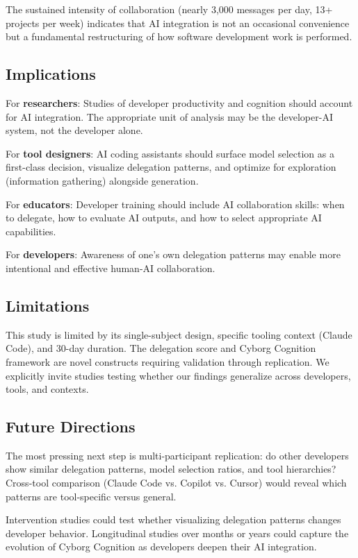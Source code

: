 \documentclass{ntlabs-preprint}
\begin{document}
The sustained intensity of collaboration (nearly 3,000 messages per day, 13+ projects per week) indicates that AI integration is not an occasional convenience but a fundamental restructuring of how software development work is performed.

\subsection{Implications}

For \textbf{researchers}: Studies of developer productivity and cognition should account for AI integration. The appropriate unit of analysis may be the developer-AI system, not the developer alone.

For \textbf{tool designers}: AI coding assistants should surface model selection as a first-class decision, visualize delegation patterns, and optimize for exploration (information gathering) alongside generation.

For \textbf{educators}: Developer training should include AI collaboration skills: when to delegate, how to evaluate AI outputs, and how to select appropriate AI capabilities.

For \textbf{developers}: Awareness of one's own delegation patterns may enable more intentional and effective human-AI collaboration.

\subsection{Limitations}

This study is limited by its single-subject design, specific tooling context (Claude Code), and 30-day duration. The delegation score and Cyborg Cognition framework are novel constructs requiring validation through replication. We explicitly invite studies testing whether our findings generalize across developers, tools, and contexts.

\subsection{Future Directions}

The most pressing next step is multi-participant replication: do other developers show similar delegation patterns, model selection ratios, and tool hierarchies? Cross-tool comparison (Claude Code vs. Copilot vs. Cursor) would reveal which patterns are tool-specific versus general.

Intervention studies could test whether visualizing delegation patterns changes developer behavior. Longitudinal studies over months or years could capture the evolution of Cyborg Cognition as developers deepen their AI integration.
\end{document}

